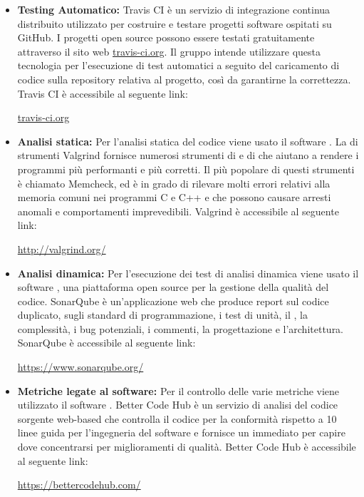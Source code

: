 \documentclass[../NormediProgetto.tex]{subfiles}
\begin{document}
	\begin{itemize}
		\item \textbf{Testing Automatico:} Travis CI è un servizio di integrazione continua distribuito utilizzato per costruire e testare progetti software ospitati su GitHub. I progetti open source possono essere testati gratuitamente attraverso il sito web \url{travis-ci.org}. Il gruppo intende utilizzare questa tecnologia per l'esecuzione di test automatici a seguito del caricamento di codice sulla repository relativa al progetto, così da garantirne la correttezza. Travis CI è accessibile al seguente link:
		\begin{center}
			\url{travis-ci.org}
		\end{center}
		
		\item \textbf{Analisi statica:} Per l’analisi statica del codice viene usato il software . La  di strumenti Valgrind fornisce numerosi strumenti di  e di  che aiutano a rendere i programmi più performanti e più corretti. Il più popolare di questi strumenti è chiamato Memcheck, ed è in grado di rilevare molti errori relativi alla memoria comuni nei programmi C e C++ e che possono causare arresti anomali e comportamenti imprevedibili. Valgrind è accessibile al seguente link: 
		\begin{center}
			\url{http://valgrind.org/}
		\end{center}
		
		\item \textbf{Analisi dinamica:} Per l’esecuzione dei test di analisi dinamica viene usato il software , una piattaforma open source per la gestione della qualità del codice. SonarQube è un’applicazione web che produce report sul codice duplicato, sugli standard di programmazione, i test di unità, il , la complessità, i bug potenziali, i commenti, la progettazione e l’architettura. SonarQube è accessibile al seguente link:
		\begin{center}
			\url{https://www.sonarqube.org/}
		\end{center}
		
		\item \textbf{Metriche legate al software:} Per il controllo delle varie metriche viene utilizzato il software . Better Code Hub è un servizio di analisi del codice sorgente web-based che controlla il codice per la conformità rispetto a 10 linee guida per l'ingegneria del software e fornisce un  immediato per capire dove concentrarsi per miglioramenti di qualità. Better Code Hub è accessibile al seguente link:
		\begin{center}
			\url{https://bettercodehub.com/}
		\end{center}
	\end{itemize}
\end{document}
